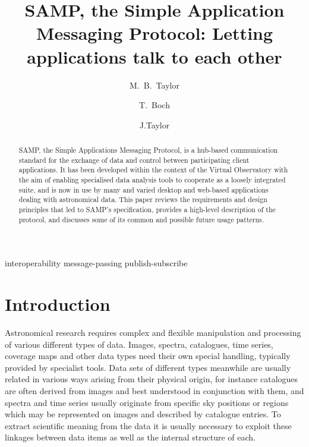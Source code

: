 \documentclass[5p]{elsarticle}
\begin{document}
\begin{frontmatter}

\title{SAMP, the Simple Application Messaging Protocol:
       Letting applications talk to each other}

\author[bristol]{M.~B.~Taylor}
\author[cds]{T.~Boch}
\author[google]{J.Taylor}

\address[bristol]{H.~H.~Wills Physics Laboratory, University of Bristol, UK}
\address[cds]{CDS, Observatoire Astronomique de Strasbourg, France}
\address[google]{Google, USA}

\begin{abstract}
SAMP, the Simple Applications Messaging Protocol, is a
hub-based communication standard for the exchange of data and control
between participating client applications.
It has been developed within the context of the Virtual Observatory
with the aim of enabling specialised data analysis tools to cooperate
as a loosely integrated suite, and is now in use by many and varied
desktop and web-based applications dealing with astronomical data.
This paper reviews the requirements and design principles that led to
SAMP's specification, provides a high-level description of the protocol,
and discusses some of its common and possible future usage patterns.
\end{abstract}

\begin{keyword}
interoperability
message-passing
publish-subscribe
\end{keyword}

\end{frontmatter}

\begin{flushright}
{\tt }
\end{flushright}

\newcommand{\kdot}{.\linebreak[0]}

\section{Introduction}

Astronomical research requires complex and flexible manipulation
and processing of various different types of data.
Images, spectra, catalogues, time series, coverage maps and other data
types need their own special handling,
typically provided by specialist tools.
Data sets of different types meanwhile are usually related
in various ways arising from their physical origin,
for instance
catalogues are often derived from images and best understood in
conjunction with them, and
spectra and time series usually originate from specific sky positions
or regions which may be represented on images and described by
catalogue entries.
To extract scientific meaning from the data it is usually necessary
to exploit these linkages between data items as well as the
internal structure of each.
\end{document}
